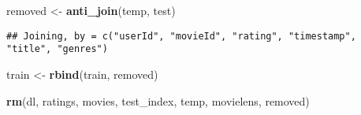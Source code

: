 \documentclass[]{article}
\newenvironment{Shaded}{\begin{snugshade}}{\end{snugshade}}
\newcommand{\KeywordTok}[1]{\textcolor[rgb]{0.13,0.29,0.53}{\textbf{#1}}}
\newcommand{\DataTypeTok}[1]{\textcolor[rgb]{0.13,0.29,0.53}{#1}}
\newcommand{\DecValTok}[1]{\textcolor[rgb]{0.00,0.00,0.81}{#1}}
\newcommand{\FloatTok}[1]{\textcolor[rgb]{0.00,0.00,0.81}{#1}}
\newcommand{\StringTok}[1]{\textcolor[rgb]{0.31,0.60,0.02}{#1}}
\newcommand{\OtherTok}[1]{\textcolor[rgb]{0.56,0.35,0.01}{#1}}
\newcommand{\OperatorTok}[1]{\textcolor[rgb]{0.81,0.36,0.00}{\textbf{#1}}}
\newcommand{\NormalTok}[1]{#1}
\begin{document}
\begin{Shaded}
\end{Shaded}

\begin{Shaded}
\end{Shaded}

\begin{Shaded}
\begin{Highlighting}[]
\NormalTok{removed <-}\StringTok{ }\KeywordTok{anti_join}\NormalTok{(temp, test)}
\end{Highlighting}
\end{Shaded}

\begin{verbatim}
## Joining, by = c("userId", "movieId", "rating", "timestamp", "title", "genres")
\end{verbatim}

\begin{Shaded}
\begin{Highlighting}[]
\NormalTok{train <-}\StringTok{ }\KeywordTok{rbind}\NormalTok{(train, removed)}
\end{Highlighting}
\end{Shaded}

\begin{Shaded}
\begin{Highlighting}[]
\KeywordTok{rm}\NormalTok{(dl, ratings, movies, test_index, temp, movielens, removed)}
\end{Highlighting}
\end{Shaded}
\end{document}
